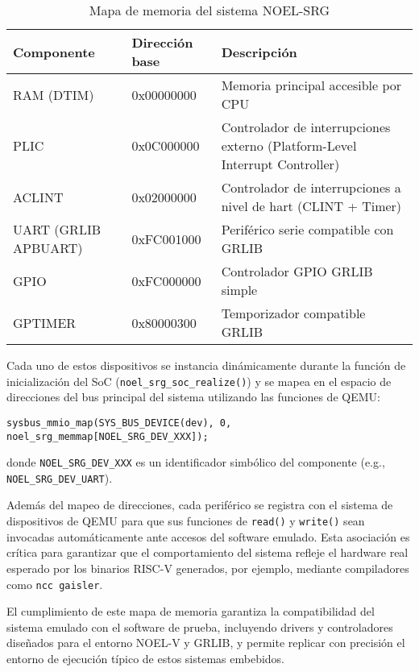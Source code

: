 \begin{table}[H]
\centering
\begin{tabularx}{\textwidth}{|l|l|X|}
\hline
\textbf{Componente} & \textbf{Dirección base} & \textbf{Descripción} \\
\hline
RAM (DTIM) & 0x00000000 & Memoria principal accesible por CPU \\
PLIC & 0x0C000000 & Controlador de interrupciones externo (Platform-Level Interrupt Controller) \\
ACLINT & 0x02000000 & Controlador de interrupciones a nivel de hart (CLINT + Timer) \\
UART (GRLIB APBUART) & 0xFC001000 & Periférico serie compatible con GRLIB \\
GPIO & 0xFC000000 & Controlador GPIO GRLIB simple \\
GPTIMER & 0x80000300 & Temporizador compatible GRLIB \\
\hline
\end{tabularx}
\caption{Mapa de memoria del sistema NOEL-SRG}
\label{tab:noel-memmap}
\end{table}

Cada uno de estos dispositivos se instancia dinámicamente durante la función de inicialización del SoC (\texttt{noel\_srg\_soc\_realize()}) y se mapea en el espacio de direcciones del bus principal del sistema utilizando las funciones de QEMU:

\begin{verbatim}
sysbus_mmio_map(SYS_BUS_DEVICE(dev), 0, noel_srg_memmap[NOEL_SRG_DEV_XXX]);
\end{verbatim}

donde \texttt{NOEL\_SRG\_DEV\_XXX} es un identificador simbólico del componente (e.g., \texttt{NOEL\_SRG\_DEV\_UART}).

Además del mapeo de direcciones, cada periférico se registra con el sistema de dispositivos de QEMU para que sus funciones de \texttt{read()} y \texttt{write()} sean invocadas automáticamente ante accesos del software emulado. Esta asociación es crítica para garantizar que el comportamiento del sistema refleje el hardware real esperado por los binarios RISC-V generados, por ejemplo, mediante compiladores como \texttt{ncc gaisler}.

El cumplimiento de este mapa de memoria garantiza la compatibilidad del sistema emulado con el software de prueba, incluyendo drivers y controladores diseñados para el entorno NOEL-V y GRLIB, y permite replicar con precisión el entorno de ejecución típico de estos sistemas embebidos.


